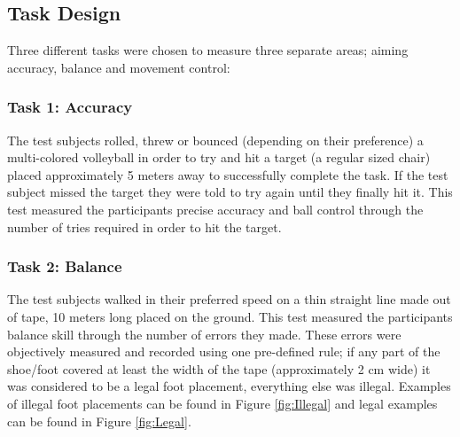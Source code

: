 \documentclass[runningheads,a4paper,oribibl]{llncs}
\begin{document}
\subsection{Task Design} \label{subsec:TaskDesign}
Three different tasks were chosen to measure three separate areas; aiming accuracy, balance and movement control:

\subsubsection{Task 1: Accuracy}

The test subjects rolled, threw or bounced (depending on their preference) a multi-colored volleyball in order to try and hit a target (a regular sized chair) placed approximately 5 meters away to successfully complete the task. If the test subject missed the target they were told to try again until they finally hit it. This test measured the participants precise accuracy and ball control through the number of tries required in order to hit the target.


\subsubsection{Task 2: Balance}

The test subjects walked in their preferred speed on a thin straight line made out of tape, 10 meters long placed on the ground. This test measured the participants balance skill through the number of errors they made. These errors were objectively measured and recorded using one pre-defined rule; if any part of the shoe/foot covered at least the width of the tape (approximately 2 cm wide) it was considered to be a legal foot placement, everything else was illegal. Examples of illegal foot placements can be found in Figure \ref{fig:Illegal} and legal examples can be found in Figure \ref{fig:Legal}.
\end{document}
